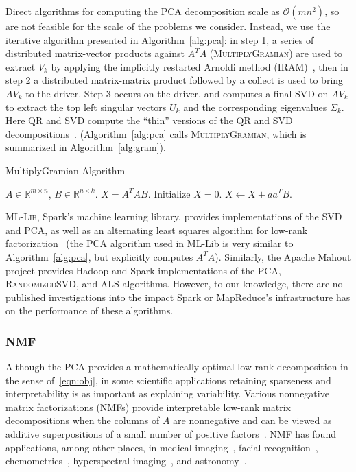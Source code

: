 Direct algorithms for computing the PCA decomposition scale as $\mathcal{O}(mn^2)$, so are not feasible for the scale of the problems we consider. Instead, we use the iterative algorithm presented in Algorithm~\ref{alg:pca}: in step 1, a series of distributed matrix-vector products against $A^T A$  (\textsc{MultiplyGramian}) are used to extract $V_k$ by applying the implicitly restarted Arnoldi method (\textsc{IRAM})~\cite{lehoucq1996deflation}, then in step 2 a distributed matrix-matrix product followed by a collect is used to bring $AV_k$ to the driver. Step 3 occurs on the driver, and computes a final SVD on $AV_k$ to extract the top left singular vectors $U_k$ and the corresponding eigenvalues $\Sigma_k.$ Here QR and SVD compute the ``thin'' versions of the QR and SVD decompositions~\cite{GVL96}. (Algorithm~\ref{alg:pca} calls \textsc{MultiplyGramian}, which is summarized in Algorithm~\ref{alg:gram}).

  \begin{algorithm}[tb]
    \caption{{\sc MultiplyGramian} Algorithm}
    \label{alg:gram}
    \begin{algorithmic}[1]
      \Require $A \in \mathbb{R}^{m\times n}$, $B \in \mathbb{R}^{n\times k}$.
      \Ensure $X = A^T A B$.
      \State Initialize $X = 0$.
          \State $X \gets X + a a^T B$.
      \EndFor
    \end{algorithmic}
\end{algorithm}

\textsc{ML-Lib}, Spark's machine learning library, provides implementations of the SVD and PCA, as well as an alternating least squares algorithm for low-rank factorization~\cite{meng2015mllib} (the PCA algorithm used in ML-Lib is very similar to Algorithm~\ref{alg:pca}, but explicitly computes $A^TA$). Similarly, the Apache Mahout project provides Hadoop and Spark implementations of the PCA, \textsc{RandomizedSVD}, and ALS algorithms. However, to our knowledge, there are no published investigations into the impact Spark or MapReduce's infrastructure has on the performance of these algorithms.
  
\subsubsection{NMF}
Although the PCA provides a mathematically optimal low-rank decomposition in the sense of~\eqref{eqn:obj}, in some scientific applications retaining sparseness and interpretability is as important as explaining variability. 
Various nonnegative matrix factorizations (NMFs) provide interpretable low-rank matrix decompositions when the columns of $A$ are nonnegative and can be viewed as additive superpositions of a small number of positive factors~\cite{gillis2014and}. NMF has found applications, among other places, in medical imaging~\cite{lee2001nmf}, facial recognition~\cite{guillamet2002non}, chemometrics~\cite{Paatero199723}, hyperspectral imaging~\cite{gillis2015hierarchical}, and astronomy~\cite{pauca2006nonnegative}.


